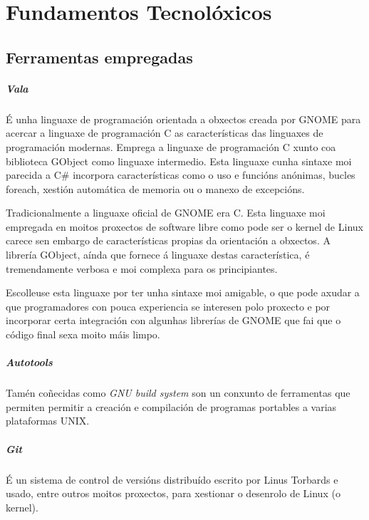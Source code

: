 \chapter{Fundamentos Tecnolóxicos}

\section{Ferramentas empregadas}

\paragraph{Vala} É unha linguaxe de programación orientada a obxectos creada por GNOME para acercar a linguaxe de programación C as características das linguaxes de programación modernas. Emprega a linguaxe de programación C xunto coa biblioteca GObject como linguaxe intermedio. Esta linguaxe cunha sintaxe moi parecida a C\# incorpora características como o uso e funcións anónimas, bucles foreach, xestión automática de memoria ou o manexo de excepcións.

Tradicionalmente a linguaxe oficial de GNOME era C. Esta linguaxe moi empregada en moitos proxectos de software libre como pode ser o kernel de Linux carece sen embargo de características propias da orientación a obxectos. A librería GObject, aínda que fornece á linguaxe destas característica, é tremendamente verbosa e moi complexa para os principiantes.

Escolleuse esta linguaxe por ter unha sintaxe moi amigable, o que pode axudar a que programadores con pouca experiencia se interesen polo proxecto e por incorporar certa integración con algunhas librerías de GNOME que fai que o código final sexa moito máis limpo.

 \paragraph{Autotools} Tamén coñecidas como \emph{GNU build system} son un conxunto de ferramentas que permiten permitir a creación e compilación de programas portables a varias plataformas UNIX.

 \paragraph{Git} É un sistema de control de versións distribuído escrito por Linus Torbards e usado, entre outros moitos proxectos, para xestionar o desenrolo de Linux (o kernel).

